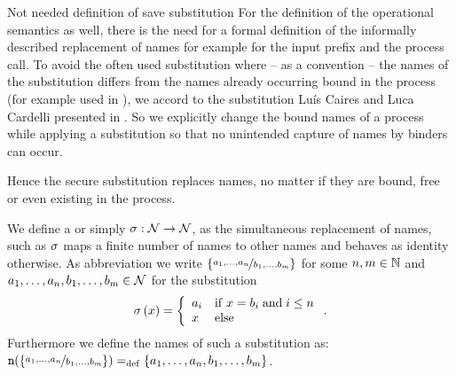 \begin{old}{Not needed definition of save substitution}
For the definition of the operational semantics as well, there is the need for a formal definition of the informally described replacement of names for example for the input prefix and the process call. To avoid the often used substitution where -- as a convention -- the names of the substitution differs from the names already occurring bound in the process (for example used in \cite{sangiorgi}), we accord to the substitution Lu\'{i}s Caires and Luca Cardelli presented in \cite{caires}. So we explicitly change the bound names of a process while applying a substitution so that no unintended capture of names by binders can occur.

Hence the secure substitution replaces names, no matter if they are bound, free or even existing in the process.
\begin{definition}
\label{def_substitution}
	We define a  or simply  $\sigma:\mathcal N\rightarrow\mathcal N$, as the simultaneous replacement of names, such as $\sigma$ maps a finite number of names to other names and behaves as identity otherwise. As abbreviation we write $\left\{\nicefrac{a_1,\ldots,a_n}{b_1,\ldots,b_m}\right\}$ for some $n,m\in\mathbb N$ and $a_1,\ldots,a_n,b_1,\ldots,b_m\in\mathcal N$ for the substitution
	\[\sigma\left(x\right) =\left\{\begin{array}{ll}
									a_i & \mathrm{if}\; x=b_i \;\text{and} \; i\leq{}n\\
									x & \text{else}
									\end{array}
								\right..\]
	Furthermore we define the names of such a substitution as: $\n{\subs{a_1,\ldots,a_n}{b_1,\ldots,b_m}}\define\set{a_1,\ldots,a_n,b_1,\ldots,b_m}$. 


\end{definition}
\end{old}
